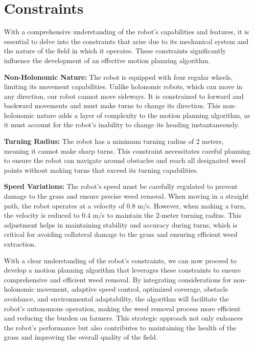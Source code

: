 \section{Constraints}

With a comprehensive understanding of the robot's capabilities and features, it is essential to delve into the constraints that arise due to its mechanical system and the nature of the field in which it operates. These constraints significantly influence the development of an effective motion planning algorithm.

\vspace{3mm}

\textbf{Non-Holonomic Nature:}
The robot is equipped with four regular wheels, limiting its movement capabilities. Unlike holonomic robots, which can move in any direction, our robot cannot move sideways. It is constrained to forward and backward movements and must make turns to change its direction. This non-holonomic nature adds a layer of complexity to the motion planning algorithm, as it must account for the robot's inability to change its heading instantaneously.

\vspace{3mm}

\textbf{Turning Radius:} The robot has a minimum turning radius of 2 meters, meaning it cannot make sharp turns. This constraint necessitates careful planning to ensure the robot can navigate around obstacles and reach all designated weed points without making turns that exceed its turning capabilities.

\vspace{3mm}

\textbf{Speed Variations:} The robot's speed must be carefully regulated to prevent damage to the grass and ensure precise weed removal. When moving in a straight path, the robot operates at a velocity of 0.8 m/s. However, when making a turn, the velocity is reduced to 0.4 m/s to maintain the 2-meter turning radius. This adjustment helps in maintaining stability and accuracy during turns, which is critical for avoiding collateral damage to the grass and ensuring efficient weed extraction.



\vspace{3mm}



With a clear understanding of the robot's constraints, we can now proceed to develop a motion planning algorithm that leverages these constraints to ensure comprehensive and efficient weed removal. By integrating considerations for non-holonomic movement, adaptive speed control, optimized coverage, obstacle avoidance, and environmental adaptability, the algorithm will facilitate the robot's autonomous operation, making the weed removal process more efficient and reducing the burden on farmers. This strategic approach not only enhances the robot's performance but also contributes to maintaining the health of the grass and improving the overall quality of the field.